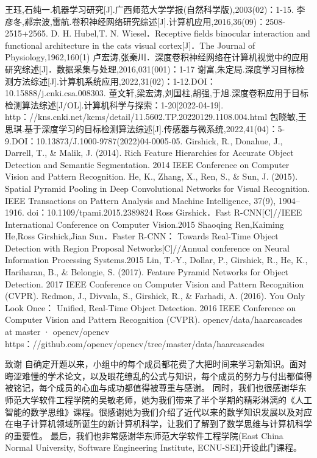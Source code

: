 	王珏,石纯一.机器学习研究[J].广西师范大学学报(自然科学版),2003(02)：1-15.
	李彦冬,郝宗波,雷航.卷积神经网络研究综述[J].计算机应用,2016,36(09)：2508-2515+2565.
	D. H. Hubel,T. N. Wiesel．Receptive fields binocular interaction and functional architecture in the cats visual cortex[J]．The Journal of Physiology,1962,160(1)
	卢宏涛,张秦川．深度卷积神经网络在计算机视觉中的应用研究综述[J]．数据采集与处理,2016,031(001)：1-17
	谢富,朱定局.深度学习目标检测方法综述[J].计算机系统应用,2022,31(02)：1-12.DOI：10.15888/j.cnki.csa.008303.
	董文轩,梁宏涛,刘国柱,胡强,于旭.深度卷积应用于目标检测算法综述[J/OL].计算机科学与探索：1-20[2022-04-19]. http：//kns.cnki.net/kcms/detail/11.5602.TP.20220129.1108.004.html 
	包晓敏,王思琪.基于深度学习的目标检测算法综述[J].传感器与微系统,2022,41(04)：5-9.DOI：10.13873/J.1000-9787(2022)04-0005-05.
	Girshick, R., Donahue, J., Darrell, T., & Malik, J. (2014). Rich Feature Hierarchies for Accurate Object Detection and Semantic Segmentation. 2014 IEEE Conference on Computer Vision and Pattern Recognition.
	He, K., Zhang, X., Ren, S., & Sun, J. (2015). Spatial Pyramid Pooling in Deep Convolutional Networks for Visual Recognition. IEEE Transactions on Pattern Analysis and Machine Intelligence, 37(9), 1904–1916. doi：10.1109/tpami.2015.2389824 
	Ross Girshick．Fast R-CNN[C]//IEEE International Conference on Computer Vision.2015
	Shaoqing Ren,Kaiming He,Ross Girshick,Jian Sun．Faster R-CNN： Towards Real-Time Object Detection with Region Proposal Networks[C]//Annual conference on Neural Information Processing Systems.2015
	Lin, T.-Y., Dollar, P., Girshick, R., He, K., Hariharan, B., & Belongie, S. (2017). Feature Pyramid Networks for Object Detection. 2017 IEEE Conference on Computer Vision and Pattern Recognition (CVPR).
	Redmon, J., Divvala, S., Girshick, R., & Farhadi, A. (2016). You Only Look Once： Unified, Real-Time Object Detection. 2016 IEEE Conference on Computer Vision and Pattern Recognition (CVPR).
	opencv/data/haarcascades at master · opencv/opencv https：//github.com/opencv/opencv/tree/master/data/haarcascades 

致谢
自确定开题以来，小组中的每个成员都花费了大把时间来学习新知识。面对晦涩难懂的学术论文，以及眼花缭乱的公式与知识，每个成员的努力与付出都值得被铭记，每个成员的心血与成功都值得被尊重与感谢。
同时，我们也很感谢华东师范大学软件工程学院的吴敏老师，她为我们带来了半个学期的精彩淋漓的《人工智能的数学思维》课程。很感谢她为我们介绍了近代以来的数学知识发展以及对应在电子计算机领域所诞生的新计算机科学，让我们了解到了数学思维与计算机科学的重要性。
最后，我们也非常感谢华东师范大学软件工程学院(East China Normal University, Software Engineering Institute, ECNU-SEI)开设此门课程。 

